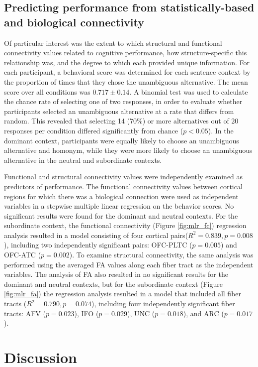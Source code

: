\documentclass[final,authoryear,5p,times,twocolumn]{elsarticle}
\begin{document}
\subsection{Predicting performance from statistically-based and biological connectivity}
Of particular interest was the extent to which structural and functional connectivity values related to cognitive performance, how structure-specific this relationship was, and the degree to which each provided unique information. For each participant, a behavioral score was determined for each sentence context by the proportion of times that they chose the unambiguous alternative. The mean score over all conditions was $0.717 \pm 0.14$. A binomial test was used to calculate the chance rate of selecting one of two responses, in order to evaluate whether participants selected an unambiguous alternative at a rate that differs from random. This revealed that selecting 14 (70\%) or more alternatives out of 20 responses per condition differed significantly from chance ($p<0.05$). In the dominant context, participants were equally likely to choose an unambiguous alternative and homonym, while they were more likely to choose an unambiguous alternative in the neutral and subordinate contexts. 

Functional and structural connectivity values were independently examined as predictors of performance. The functional connectivity values between cortical regions for which there was a biological connection were used as independent variables in a stepwise multiple linear regression on the behavior scores. No significant results were found for the dominant and neutral contexts. For the subordinate context, the functional connectivity (Figure \ref{fig:mlr_fc}) regression analysis resulted in a model consisting of four cortical pairs($R^2=0.839, p=0.008$), including two independently significant pairs: OFC-PLTC ($p=0.005$) and OFC-ATC ($p=0.002$). To examine structural connectivity, the same analysis was performed using the averaged FA values along each fiber tract as the independent variables.  The analysis of FA also resulted in no significant results for the dominant and neutral contexts, but for the subordinate context (Figure \ref{fig:mlr_fa}) the regression analysis resulted in a model that included all fiber tracts ($R^2=0.790, p=0.074$), including four independently significant fiber tracts: AFV ($p=0.023$), IFO ($p=0.029$), UNC ($p=0.018$), and ARC ($p=0.017$).

\section{Discussion}
\end{document}
